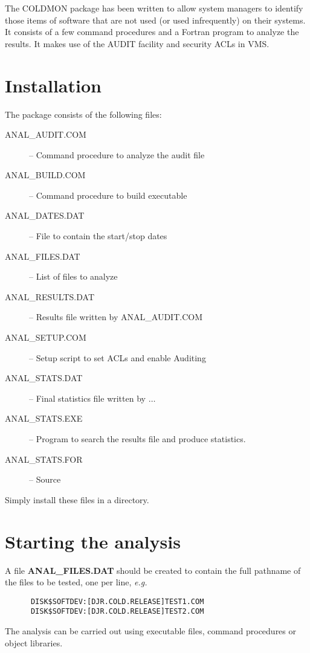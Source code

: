The COLDMON package has been written to allow system managers to identify those
items of software that are not used (or used infrequently) on their systems. It
consists of a few command procedures and a Fortran program to analyze the
results. It makes use of the AUDIT facility and security ACLs in VMS.

\section{Installation}

The package consists of the following files:

\begin{description}
\item [ANAL\_AUDIT.COM]  -- Command procedure to analyze the audit file
\item [ANAL\_BUILD.COM]  -- Command procedure to build executable
\item [ANAL\_DATES.DAT]  -- File to contain the start/stop dates
\item [ANAL\_FILES.DAT] -- List of files to analyze
\item [ANAL\_RESULTS.DAT]  -- Results file written by ANAL\_AUDIT.COM
\item [ANAL\_SETUP.COM]  -- Setup script to set ACLs and enable Auditing
\item [ANAL\_STATS.DAT]  -- Final statistics file written by $\ldots$
\item [ANAL\_STATS.EXE]  -- Program to search the results file and produce
statistics.
\item [ANAL\_STATS.FOR]  -- Source
\end{description}

Simply install these files in a directory.

\section{Starting the analysis}

A file {\bf ANAL\_FILES.DAT} should be created to contain the full pathname of
the files to be tested, one per line, {\em e.g.}

\begin{verbatim}
      DISK$SOFTDEV:[DJR.COLD.RELEASE]TEST1.COM
      DISK$SOFTDEV:[DJR.COLD.RELEASE]TEST2.COM
\end{verbatim}

The analysis can be carried out using executable files, command procedures or
object libraries.

